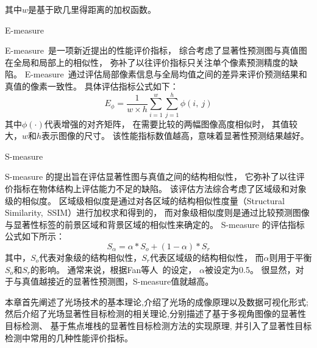 %
%
其中$w$是基于欧几里得距离的加权函数。\par
%
%
E-measure\par
%
%
E-measure~是一项新近提出的性能评价指标，
综合考虑了显著性预测图与真值图在全局和局部上的相似性，
弥补了以往评价指标只关注单个像素预测精度的缺陷。
E-measure~通过评估局部像素信息与全局均值之间的差异来评价预测结果和真值的像素一致性。
具体评估指标公式如下：
\begin{equation}
	E_{\phi } = \frac{1}{w \times h} \sum_{i=1}^{w} \sum_{j=1}^{h} \phi\left ( i,~j \right ) 
\end{equation}
其中$\phi\left (\cdot \right ) $代表增强的对齐矩阵，
在需要比较的两幅图像高度相似时，
其值较大，$w$和$h$表示图像的尺寸。
该性能指标数值越高，意味着显著性预测结果越好。\par
%
%
%
%
S-measure\par
%
%
%
S-measure 的提出旨在评估显著性图与真值之间的结构相似性，
它弥补了以往评价指标在物体结构上评估能力不足的缺陷。
该评估方法综合考虑了区域级和对象级的相似度。
区域级相似度是通过对各区域的结构相似性度量（Structural Similarity,~SSIM）进行加权求和得到的，
而对象级相似度则是通过比较预测图像与显著性标签的前景区域和背景区域的相似性来确定的。
S-measure 的评估指标公式如下所示：
\begin{equation}
	S_{\alpha} = \alpha * S_{o} + \left ( 1 - \alpha  \right )*S_{r} 
\end{equation}
%
%
其中，$S_{o}$代表对象级的结构相似性，$S_{r}$代表区域级的结构相似性，
而$\alpha$则用于平衡$S_{o}$和$S_{r}$的影响。
通常来说，根据Fan等人~\cite{fan2018enhanced}的设定，
$\alpha$被设定为0.5。
很显然，对于与真值越接近的显著性预测图，S-measure值就越高。
%
%

本章首先阐述了光场技术的基本理论,介绍了光场的成像原理以及数据可视化形式;
然后介绍了光场显著性目标检测的相关理论,分别描述了基于多视角图像的显著性目标检测、
基于焦点堆栈的显著性目标检测方法的实现原理,
并引入了显著性目标检测中常用的几种性能评价指标。